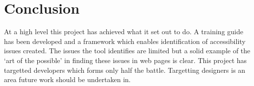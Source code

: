 \chapter{Conclusion}
\label{conclusion}
At a high level this project has achieved what it set out to do. A training
guide has been developed and a framework which enables identification of
accessibility issues created. The issues the tool identifies are limited but a
solid example of the `art of the possible' in finding these issues in web
pages is clear. This project has targetted developers which forms only half
the battle. Targetting designers is an area future work should be undertaken
in.

